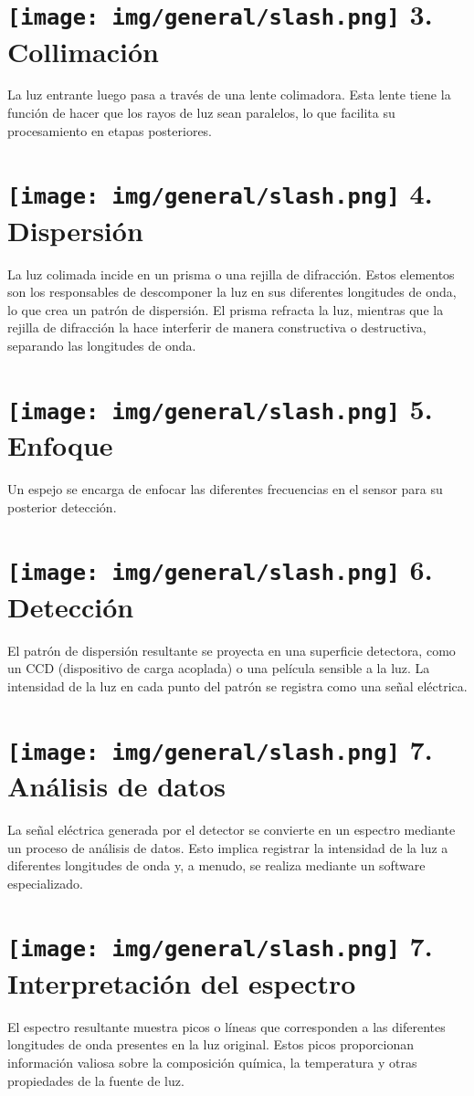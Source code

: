 \documentclass[a0paper,fleqn]{src/betterposter}
\begin{document}
{\section{\texttt{[image: img/general/slash.png]} 3. Collimación}
La luz entrante luego pasa a través de una lente colimadora. Esta lente tiene la
función de hacer que los rayos de luz sean paralelos, lo que facilita su
procesamiento en etapas posteriores.

\section{\texttt{[image: img/general/slash.png]} 4. Dispersión}
La luz colimada incide en un prisma o una rejilla de difracción. Estos elementos
son los responsables de descomponer la luz en sus diferentes longitudes de onda,
lo que crea un patrón de dispersión. El prisma refracta la luz, mientras que la
rejilla de difracción la hace interferir de manera constructiva o destructiva,
separando las longitudes de onda.

\section{\texttt{[image: img/general/slash.png]} 5. Enfoque}
Un espejo se encarga de enfocar las diferentes frecuencias en el sensor para su
posterior detección.


}{ %

\section{\texttt{[image: img/general/slash.png]} 6. Detección}
El patrón de dispersión resultante se proyecta en una superficie detectora, como
un CCD (dispositivo de carga acoplada) o una película sensible a la luz. La
intensidad de la luz en cada punto del patrón se registra como una señal
eléctrica.

\section{\texttt{[image: img/general/slash.png]} 7. Análisis de datos}
La señal eléctrica generada por el detector se convierte en un espectro mediante
un proceso de análisis de datos. Esto implica registrar la intensidad de la luz
a diferentes longitudes de onda y, a menudo, se realiza mediante un software
especializado.

\section{\texttt{[image: img/general/slash.png]} 7. Interpretación del espectro}
El espectro resultante muestra picos o líneas que corresponden a las diferentes
longitudes de onda presentes en la luz original. Estos picos proporcionan
información valiosa sobre la composición química, la temperatura y otras
propiedades de la fuente de luz. 

}
\end{document}
